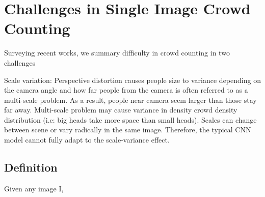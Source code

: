 
\section{Challenges in Single Image Crowd Counting}
Surveying recent works, we summary difficulty in crowd counting in two challenges

Scale variation: Perspective distortion causes people size to variance depending on the camera angle and how far people from the camera is often referred to as a multi-scale problem. As a result, people near camera seem larger than those stay far away. Multi-scale problem may cause variance in density crowd density distribution (i.e: big heads take more space than small heads). Scales can change between scene or vary radically in the same image. Therefore, the typical CNN model cannot fully adapt to the scale-variance effect. 



\subsection{Definition}

Given any image I, 